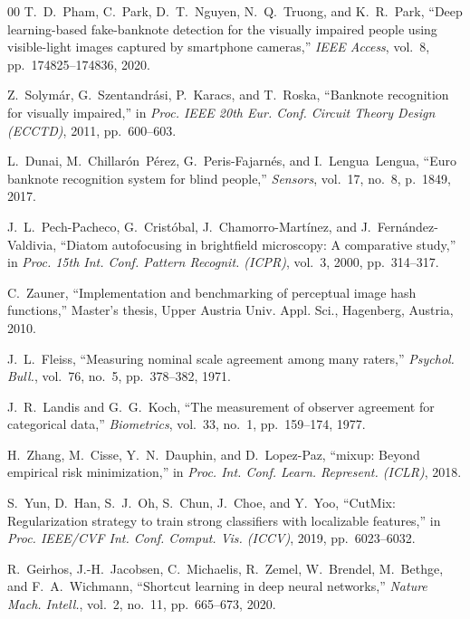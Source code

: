 \documentclass[conference]{IEEEtran}
\begin{document}
\begin{thebibliography}{00}
T.~D.~Pham, C.~Park, D.~T.~Nguyen, N.~Q.~Truong, and K.~R.~Park, ``Deep learning-based fake-banknote detection for the visually impaired people using visible-light images captured by smartphone cameras,'' \textit{IEEE Access}, vol.~8, pp.~174825--174836, 2020.

Z.~Solym{\'a}r, G.~Szentandr{\'a}si, P.~Karacs, and T.~Roska, ``Banknote recognition for visually impaired,'' in \textit{Proc. IEEE 20th Eur. Conf. Circuit Theory Design (ECCTD)}, 2011, pp.~600--603.

L.~Dunai, M.~Chillar{\'o}n~P{\'e}rez, G.~Peris-Fajarn{\'e}s, and I.~Lengua~Lengua, ``Euro banknote recognition system for blind people,'' \textit{Sensors}, vol.~17, no.~8, p.~1849, 2017.

J.~L.~Pech-Pacheco, G.~Crist{\'o}bal, J.~Chamorro-Mart{\'i}nez, and J.~Fern{\'a}ndez-Valdivia, ``Diatom autofocusing in brightfield microscopy: A comparative study,'' in \textit{Proc. 15th Int. Conf. Pattern Recognit. (ICPR)}, vol.~3, 2000, pp.~314--317.

C.~Zauner, ``Implementation and benchmarking of perceptual image hash functions,'' Master's thesis, Upper Austria Univ. Appl. Sci., Hagenberg, Austria, 2010.

J.~L.~Fleiss, ``Measuring nominal scale agreement among many raters,'' \textit{Psychol. Bull.}, vol.~76, no.~5, pp.~378--382, 1971.

J.~R.~Landis and G.~G.~Koch, ``The measurement of observer agreement for categorical data,'' \textit{Biometrics}, vol.~33, no.~1, pp.~159--174, 1977.

H.~Zhang, M.~Cisse, Y.~N.~Dauphin, and D.~Lopez-Paz, ``mixup: Beyond empirical risk minimization,'' in \textit{Proc. Int. Conf. Learn. Represent. (ICLR)}, 2018.

S.~Yun, D.~Han, S.~J.~Oh, S.~Chun, J.~Choe, and Y.~Yoo, ``CutMix: Regularization strategy to train strong classifiers with localizable features,'' in \textit{Proc. IEEE/CVF Int. Conf. Comput. Vis. (ICCV)}, 2019, pp.~6023--6032.

R.~Geirhos, J.-H.~Jacobsen, C.~Michaelis, R.~Zemel, W.~Brendel, M.~Bethge, and F.~A.~Wichmann, ``Shortcut learning in deep neural networks,'' \textit{Nature Mach. Intell.}, vol.~2, no.~11, pp.~665--673, 2020.


\end{thebibliography}
\end{document}
